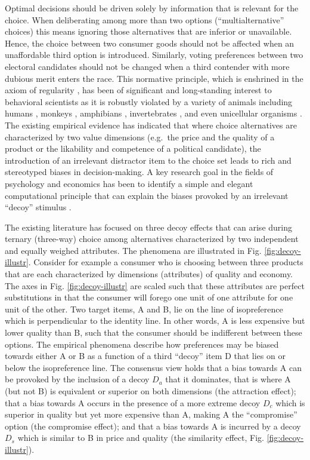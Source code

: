 \documentclass[a4paper, nobind]{templates/ociamthesis}
\begin{document}
Optimal decisions should be driven solely by information that is relevant for the choice. When deliberating among more than two options (``multialternative'' choices) this means ignoring those alternatives that are inferior or unavailable. Hence, the choice between two consumer goods should not be affected when an unaffordable third option is introduced. Similarly, voting preferences between two electoral candidates should not be changed when a third contender with more dubious merit enters the race. This normative principle, which is enshrined in the axiom of regularity \autocite{block1960,rieskamp2006}, has been of significant and long-standing interest to behavioral scientists as it is robustly violated by a variety of animals including humans \autocite{tversky1972a,huber1982,simonson1989}, monkeys \autocite{parrish2015}, amphibians \autocite{lea2015}, invertebrates \autocite{shafir1994}, and even unicellular organisms \autocite{latty2011}. The existing empirical evidence has indicated that where choice alternatives are characterized by two value dimensions (e.g.~the price and the quality of a product or the likability and competence of a political candidate), the introduction of an irrelevant distractor item to the choice set leads to rich and stereotyped biases in decision-making. A key research goal in the fields of psychology and economics has been to identify a simple and elegant computational principle that can explain the biases provoked by an irrelevant ``decoy'' stimulus \autocite{turner2018}.

The existing literature has focused on three decoy effects that can arise during ternary (three-way) choice among alternatives characterized by two independent and equally weighed attributes. The phenomena are illustrated in Fig. \ref{fig:decoy-illustr}. Consider for example a consumer who is choosing between three products that are each characterized by dimensions (attributes) of quality and economy. The axes in Fig. \ref{fig:decoy-illustr} are scaled such that these attributes are perfect substitutions in that the consumer will forego one unit of one attribute for one unit of the other. Two target items, A and B, lie on the line of isopreference which is perpendicular to the identity line. In other words, A is less expensive but lower quality than B, such that the consumer should be indifferent between these options. The empirical phenomena describe how preferences may be biased towards either A or B as a function of a third ``decoy'' item D that lies on or below the isopreference line. The consensus view holds that a bias towards A can be provoked by the inclusion of a decoy \(D_a\) that it dominates, that is where A (but not B) is equivalent or superior on both dimensions (the attraction effect); that a bias towards A occurs in the presence of a more extreme decoy \(D_c\) which is superior in quality but yet more expensive than A, making A the ``compromise'' option (the compromise effect); and that a bias towards A is incurred by a decoy \(D_s\) which is similar to B in price and quality (the similarity effect, Fig. \ref{fig:decoy-illustr}).
\end{document}
